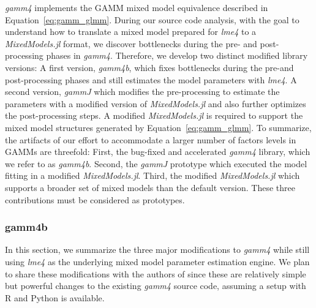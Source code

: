 \textit{gamm4} implements the GAMM mixed model equivalence described in Equation~\ref{eq:gamm_glmm}. During our source code analysis, with the goal to understand how to translate a mixed model prepared for \textit{lme4}  to a \textit{MixedModels.jl} format, we discover bottlenecks during the pre- and post-processing phases in \textit{gamm4}. Therefore, we develop two distinct modified library versions: A first version, \textit{gamm4b}, which fixes bottlenecks during the pre-and post-processing phases and still estimates the model parameters with \textit{lme4}. A second version, \textit{gammJ} which modifies the pre-processing to estimate the parameters with a modified version of \textit{MixedModels.jl} and also further optimizes the post-processing steps. A modified \textit{MixedModels.jl} is required to support the mixed model structures generated by Equation~\ref{eq:gamm_glmm}. To summarize, the artifacts of our effort to accommodate a larger number of factors levels in GAMMs are threefold: First, the bug-fixed and accelerated \textit{gamm4} library, which we refer to as \textit{gamm4b}. Second, the \textit{gammJ} prototype which executed the model fitting in a modified \textit{MixedModels.jl}. Third, the modified \textit{MixedModels.jl} which supports a broader set of mixed models than the default version. These three contributions must be considered as prototypes.

\subsubsection{gamm4b}\label{sec:gamm4b}
In this section, we summarize the three major modifications to \textit{gamm4} while still using \textit{lme4} as the underlying mixed model parameter estimation engine. We plan to share these modifications with the authors of \cite{wood_gamm4_2020} since these are relatively simple but powerful changes to the existing \textit{gamm4} source code, assuming a setup with R and Python is available.

